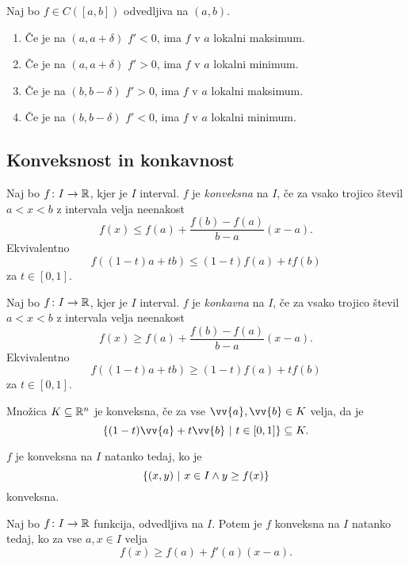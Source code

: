 \documentclass[12pt, a4paper]{article}
\begin{document}
\begin{opomba}
Naj bo $f\in C\left([a,b]\right)$ odvedljiva na $(a,b)$.

\begin{enumerate}[label=\roman*)]
\item Če je na $(a,a+\delta)$ $f'<0$, ima $f$ v $a$ lokalni maksimum.
\item Če je na $(a,a+\delta)$ $f'>0$, ima $f$ v $a$ lokalni minimum.
\item Če je na $(b,b-\delta)$ $f'>0$, ima $f$ v $a$ lokalni maksimum.
\item Če je na $(b,b-\delta)$ $f'<0$, ima $f$ v $a$ lokalni minimum.
\end{enumerate}
\end{opomba}

\newpage

\subsection{Konveksnost in konkavnost}

\begin{definicija}
Naj bo $f\colon I\to\mathbb{R}$, kjer je $I$ interval. $f$ je \emph{konveksna} na $I$, če za vsako trojico števil $a<x<b$ z intervala velja neenakost
\[
f(x)\leq f(a)+\frac{f(b)-f(a)}{b-a}(x-a).
\]
Ekvivalentno
\[
f((1-t)a+tb)\leq (1-t)f(a)+tf(b)
\]
za $t\in[0,1]$.
\end{definicija}

\begin{definicija}
Naj bo $f\colon I\to\mathbb{R}$, kjer je $I$ interval. $f$ je \emph{konkavna} na $I$, če za vsako trojico števil $a<x<b$ z intervala velja neenakost
\[
f(x)\geq f(a)+\frac{f(b)-f(a)}{b-a}(x-a).
\]
Ekvivalentno
\[
f((1-t)a+tb)\geq (1-t)f(a)+tf(b)
\]
za $t\in[0,1]$.
\end{definicija}

\begin{opomba}
Množica $K\subseteq \mathbb{R}^n$ je konveksna, če za vse $\vv{a},\vv{b}\in K$ velja, da je
\[
\setb{(1-t)\vv{a}+t\vv{b}}{t\in[0,1]}\subseteq K.
\]
\end{opomba}

\begin{opomba}
$f$ je konveksna na $I$ natanko tedaj, ko je
\[
\left\{(x,y)~\middle\vert~x\in I\land y\geq f(x)\right\}
\]
konveksna.
\end{opomba}

\begin{izrek}
Naj bo $f\colon I\to\mathbb{R}$ funkcija, odvedljiva na $I$. Potem je $f$ konveksna na $I$ natanko tedaj, ko za vse $a,x\in I$ velja
\[
f(x)\geq f(a)+f'(a)(x-a).
\]
\end{izrek}
\end{document}
